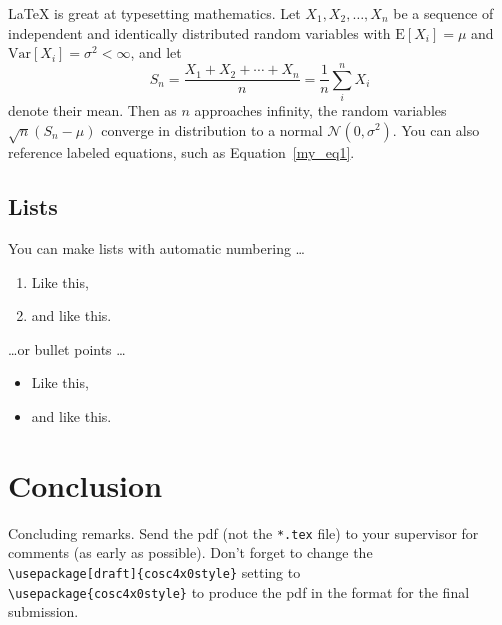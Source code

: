 \documentclass[12pt]{article}
\begin{document}
\LaTeX{} is great at typesetting mathematics. Let $X_1, X_2, \ldots, X_n$ be a sequence of independent and identically distributed random variables with $\text{E}[X_i] = \mu$ and $\text{Var}[X_i] = \sigma^2 < \infty$, and let
\begin{equation}S_n = \frac{X_1 + X_2 + \cdots + X_n}{n}
      = \frac{1}{n}\sum_{i}^{n} X_i\label{my_eq1}\end{equation}
denote their mean. Then as $n$ approaches infinity, the random variables $\sqrt{n}(S_n - \mu)$ converge in distribution to a normal $\mathcal{N}(0, \sigma^2)$. You can also reference labeled equations, such as Equation~\ref{my_eq1}.

\subsection{Lists}

You can make lists with automatic numbering \dots

\begin{enumerate}
\item Like this,
\item and like this.
\end{enumerate}
\dots or bullet points \dots
\begin{itemize}
\item Like this,
\item and like this.
\end{itemize}

\section{Conclusion}

Concluding remarks. Send the pdf (not the \verb$*.tex$ file) to your supervisor for comments (as early as possible). Don't forget to change the\\ \verb$\usepackage[draft]{cosc4x0style}$ setting to\\ \verb$\usepackage{cosc4x0style}$ to produce the pdf in the format for the final submission.


\end{document}
